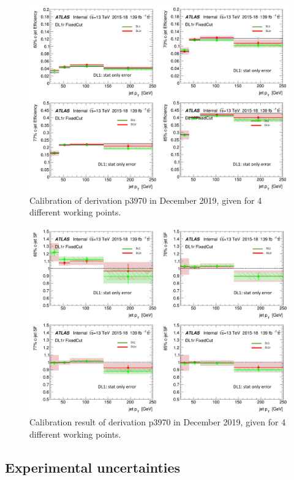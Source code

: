 \documentclass[letterpaper,12pt]{article}
\begin{document}
\newpage
\begin{figure}[H]
\includegraphics[width=1\textwidth]{Dec_eff.png}
\caption{Calibration of derivation p3970 in December 2019, given for  4 different working points.}\label{fig:Dec_eff}
\end{figure}
\newpage
\begin{figure}[H]
\includegraphics[width=1\textwidth]{Dec.png}
\caption{Calibration result of derivation p3970 in December 2019, given for  4 different working points.}\label{fig:Dec}
\end{figure}




\newpage
	

\subsection{Experimental uncertainties}
\end{document}
